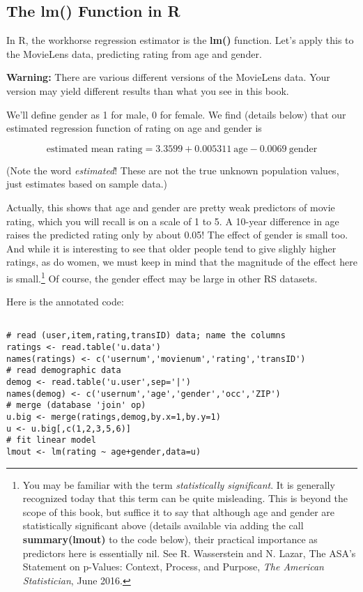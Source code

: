 \subsection{The lm() Function in R}

In R, the workhorse regression estimator is the \textbf{lm()} function.
Let's apply this to the MovieLens data, predicting rating from age and
gender.  

\textbf{Warning:} There are various different versions of the MovieLens
data. Your version may yield different results than what you see in this
book.

We'll define gender as 1 for male, 0 for female.  We find (details
below)
that our estimated regression function of rating on age and gender is

\begin{equation}
\textrm{estimated mean rating} = 3.3599 + 0.005311 ~ \textrm{age} 
- 0.0069 ~ \textrm{gender}
\end{equation}

(Note the word \textit{estimated}! These are not the true unknown
population values, just estimates based on sample data.)

Actually, this shows that age and gender are pretty weak predictors of
movie rating, which you will recall is on a scale of 1 to 5.  A 10-year
difference in age raises the predicted rating only by about 0.05!  The
effect of gender is small too.  And while it is interesting to see that
older people tend to give slighly higher ratings, as do women, we must
keep in mind that the magnitude of the effect here is
small.\footnote{You may be familiar with the term \textit{statistically
significant}.  It is generally recognized today that this term can be
quite misleading.  This is beyond the scope of this book, but suffice it
to say that although age and gender are statistically significant above
(details available via adding the call \textbf{summary(lmout)} to the
code below), their practical importance as predictors here is
essentially nil.  See R. Wasserstein and N. Lazar, The ASA's Statement
on p-Values: Context, Process, and Purpose, \textit{The American
Statistician}, June 2016.}  Of course, the gender effect may be large in
other RS datasets.

Here is the annotated code:

\begin{lstlisting}

# read (user,item,rating,transID) data; name the columns
ratings <- read.table('u.data') 
names(ratings) <- c('usernum','movienum','rating','transID') 
# read demographic data
demog <- read.table('u.user',sep='|') 
names(demog) <- c('usernum','age','gender','occ','ZIP') 
# merge (database 'join' op)
u.big <- merge(ratings,demog,by.x=1,by.y=1) 
u <- u.big[,c(1,2,3,5,6)] 
# fit linear model
lmout <- lm(rating ~ age+gender,data=u) 

\end{lstlisting}

